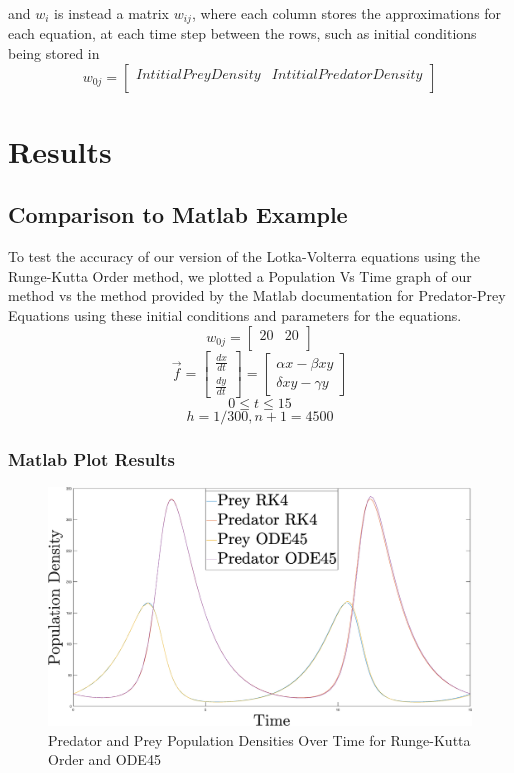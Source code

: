 \documentclass[12pt]{article}
\begin{document}
and \(w_{i}\) is instead a matrix \(w_{ij}\), where each column stores the approximations for each equation, at each time step between the rows, such as initial conditions being stored in 
\[w_{0j} = \begin{bmatrix}
Intitial Prey Density & Intitial Predator Density \\ 
\end{bmatrix} \]


\newpage

\section{Results}

\subsection{Comparison to Matlab Example}
To test the accuracy of our version of the Lotka-Volterra equations using the Runge-Kutta  Order method, we plotted a Population Vs Time graph of our method vs the method provided by the Matlab documentation for Predator-Prey Equations\cite{ODE45} using these initial conditions and parameters for the equations.
\[w_{0j} = \begin{bmatrix}
20 & 20 \\ 
\end{bmatrix} \]
\[\vec{f} = 
\begin{bmatrix}
\frac{dx}{dt}\\ \frac{dy}{dt}
\end{bmatrix}
=
\begin{bmatrix}
\alpha x-\beta xy\\ \delta xy- \gamma y
\end{bmatrix}\]
\[0\leq t \leq 15\]
\[h = 1/300, n + 1 = 4500\]



\subsubsection{Matlab Plot Results}

\begin{figure}[H]
        \begin{center}
            \includegraphics[width = 1\textwidth]{Images/Density.eps}
 		\caption{Predator and Prey Population Densities Over Time for Runge-Kutta  Order and ODE45}
 		\label{fig:1}
        \end{center}
 		
\end{figure}
\end{document}
